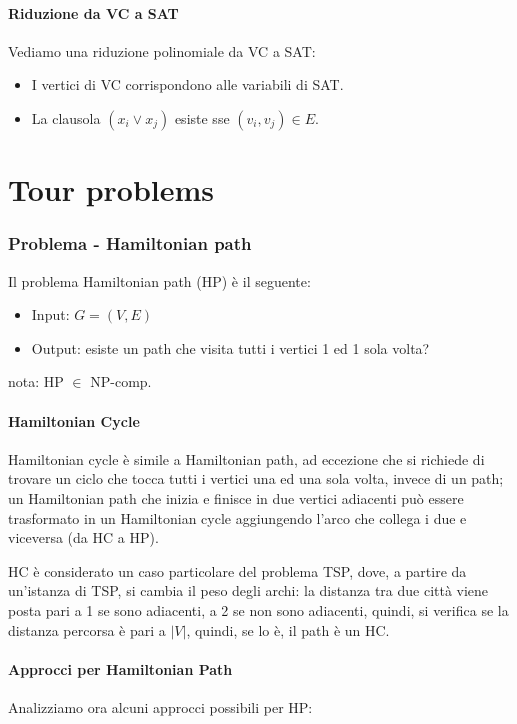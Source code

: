 \documentclass[12pt,a4paper]{article}
\begin{document}
\subsection{Riduzione da VC a SAT}
Vediamo una riduzione polinomiale da VC a SAT:
\begin{itemize}
\item I vertici di VC corrispondono alle variabili di SAT.
\item La clausola $(x_i \vee x_j)$ esiste sse $(v_i, v_j) \in E$.
\end{itemize}

\pagebreak
\part{Tour problems}

\section{Problema - Hamiltonian path}
Il problema Hamiltonian path (HP) è il seguente:
\begin{itemize}
\item Input: $G = (V, E)$
\item Output: esiste un path che visita tutti i vertici 1 ed 1 sola volta?
\end{itemize}
nota: HP $\in$ NP-comp.

\subsection{Hamiltonian Cycle}
Hamiltonian cycle è simile a Hamiltonian path, ad eccezione che si richiede di trovare un ciclo che tocca tutti i vertici una ed una sola volta, invece di un path; un Hamiltonian path che inizia e finisce in due vertici adiacenti può essere trasformato in un Hamiltonian cycle aggiungendo l'arco che collega i due e viceversa (da HC a HP).

HC è considerato un caso particolare del problema TSP, dove, a partire da un'istanza di TSP, si cambia il peso degli archi: la distanza tra due città viene posta pari a 1 se sono adiacenti, a 2 se non sono adiacenti, quindi, si verifica se la distanza percorsa è pari a $\vert V \vert$, quindi, se lo è, il path è un HC.

\subsection{Approcci per Hamiltonian Path}
Analizziamo ora alcuni approcci possibili per HP:
\end{document}
